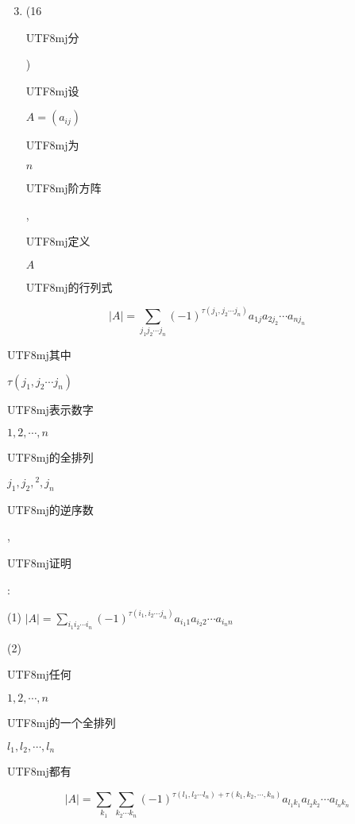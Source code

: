 \documentclass[10pt]{article}
\begin{document}
\begin{enumerate}
  \setcounter{enumi}{2}
  \item (16 \begin{CJK}{UTF8}{mj}分\end{CJK}) \begin{CJK}{UTF8}{mj}设\end{CJK} $A=\left(a_{i j}\right)$ \begin{CJK}{UTF8}{mj}为\end{CJK} $n$ \begin{CJK}{UTF8}{mj}阶方阵\end{CJK}, \begin{CJK}{UTF8}{mj}定义\end{CJK} $A$ \begin{CJK}{UTF8}{mj}的行列式\end{CJK}
\end{enumerate}
$$
|A|=\sum_{j_{1} j_{2} \cdots j_{n}}(-1)^{\tau\left(j_{1}, j_{2} \cdots j_{n}\right)} a_{1 j} a_{2 j_{2}} \cdots a_{n j_{n}}
$$
\begin{CJK}{UTF8}{mj}其中\end{CJK} $\tau\left(j_{1}, j_{2} \cdots j_{n}\right)$ \begin{CJK}{UTF8}{mj}表示数字\end{CJK} $1,2, \cdots, n$ \begin{CJK}{UTF8}{mj}的全排列\end{CJK} $j_{1}, j_{2},{ }^{2}, j_{n}$ \begin{CJK}{UTF8}{mj}的逆序数\end{CJK}, \begin{CJK}{UTF8}{mj}证明\end{CJK}:

(1) $|A|=\sum_{i_{1} i_{2} \cdots i_{n}}(-1)^{\tau\left(i_{1}, i_{2} \cdots j_{n}\right)} a_{i_{1} 1} a_{i_{2} 2} \cdots a_{i_{n} n}$

(2) \begin{CJK}{UTF8}{mj}任何\end{CJK} $1,2, \cdots, n$ \begin{CJK}{UTF8}{mj}的一个全排列\end{CJK} $l_{1}, l_{2}, \cdots, l_{n}$ \begin{CJK}{UTF8}{mj}都有\end{CJK}
$$
|A|=\sum_{k_{1}} \sum_{k_{2} \cdots k_{n}}(-1)^{\tau\left(l_{1}, l_{2} \cdots l_{n}\right)+\tau\left(k_{1}, k_{2}, \cdots, k_{n}\right)} a_{l_{1} k_{1}} a_{l_{2} k_{2}} \cdots a_{l_{n} k_{n}}
$$
\end{document}
